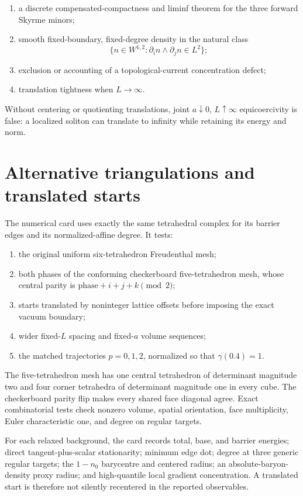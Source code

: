 \documentclass[11pt]{article}
\numberwithin{equation}{section}
\theoremstyle{definition}
\theoremstyle{remark}
\begin{document}
\begin{enumerate}
\item a discrete compensated-compactness and liminf theorem for the three
forward Skyrme minors;
\item smooth fixed-boundary, fixed-degree density in the natural class
\[
 \{n\in W^{1,2}:\partial_i n\wedge\partial_j n\in L^2\};
\]
\item exclusion or accounting of a topological-current concentration defect;
\item translation tightness when $L\to\infty$.
\end{enumerate}

Without centering or quotienting translations, joint $a\downarrow0$,
$L\uparrow\infty$ equicoercivity is false: a localized soliton can translate
to infinity while retaining its energy and norm.

\section{Alternative triangulations and translated starts}

The numerical card uses exactly the same tetrahedral complex for its barrier
edges and its normalized-affine degree.  It tests:

\begin{enumerate}
\item the original uniform six-tetrahedron Freudenthal mesh;
\item both phases of the conforming checkerboard five-tetrahedron mesh, whose
central parity is $\mathrm{phase}+i+j+k\pmod2$;
\item starts translated by noninteger lattice offsets before imposing the
exact vacuum boundary;
\item wider fixed-$L$ spacing and fixed-$a$ volume sequences;
\item the matched trajectories $p=0,1,2$, normalized so that
$\gamma(0.4)=1$.
\end{enumerate}

The five-tetrahedron mesh has one central tetrahedron of determinant magnitude
two and four corner tetrahedra of determinant magnitude one in every cube.
The checkerboard parity flip makes every shared face diagonal agree.  Exact
combinatorial tests check nonzero volume, spatial orientation, face
multiplicity, Euler characteristic one, and degree on regular targets.

For each relaxed background, the card records total, base, and barrier
energies; direct tangent-plus-scalar stationarity; minimum edge dot; degree at
three generic regular targets; the $1-n_0$ barycentre and centered radius;
an absolute-baryon-density proxy radius; and high-quantile local gradient
concentration.  A translated start is therefore not silently recentered in
the reported observables.
\end{document}
